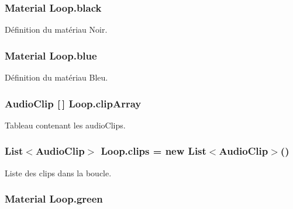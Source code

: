 \subsubsection[{black}]{\setlength{\rightskip}{0pt plus 5cm}Material Loop.\+black\hspace{0.3cm}{\ttfamily [private]}}\label{class_loop_ad2d1665b1488b64a26f42ed2ab7dc83a}


Définition du matériau Noir. 

\hypertarget{class_loop_abdff42bcd7fd2129d096263de28962ba}{}
\subsubsection[{blue}]{\setlength{\rightskip}{0pt plus 5cm}Material Loop.\+blue\hspace{0.3cm}{\ttfamily [private]}}\label{class_loop_abdff42bcd7fd2129d096263de28962ba}


Définition du matériau Bleu. 

\hypertarget{class_loop_a1dfc5163d00ce897737c2a9bb95d72c3}{}
\subsubsection[{clip\+Array}]{\setlength{\rightskip}{0pt plus 5cm}Audio\+Clip \mbox{[}$\,$\mbox{]} Loop.\+clip\+Array\hspace{0.3cm}{\ttfamily [private]}}\label{class_loop_a1dfc5163d00ce897737c2a9bb95d72c3}


Tableau contenant les audio\+Clips. 

\hypertarget{class_loop_a900e93bdf5d703ce8bf4f12fa754e022}{}
\subsubsection[{clips}]{\setlength{\rightskip}{0pt plus 5cm}List$<$Audio\+Clip$>$ Loop.\+clips = new List$<$Audio\+Clip$>$()}\label{class_loop_a900e93bdf5d703ce8bf4f12fa754e022}


Liste des clips dans la boucle. 

\hypertarget{class_loop_ad073115a8a8c600f326b875b2f8b6d35}{}
\subsubsection[{green}]{\setlength{\rightskip}{0pt plus 5cm}Material Loop.\+green\hspace{0.3cm}{\ttfamily [private]}}\label{class_loop_ad073115a8a8c600f326b875b2f8b6d35}


